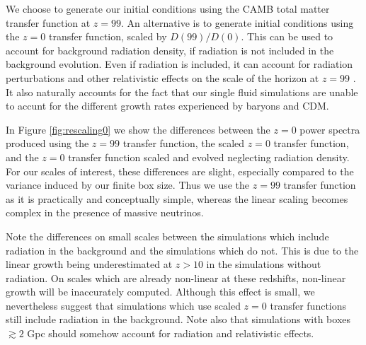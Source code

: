 \documentclass[useAMS, usenatbib]{mnras}
\begin{document}
We choose to generate our initial conditions using the CAMB total matter transfer
function at $z=99$. An alternative is to generate initial conditions
using the $z=0$ transfer function, scaled by $D(99)/D(0)$. This can
be used to account for background radiation density, if radiation is not included
in the background evolution. Even if radiation is included, it can account
for radiation perturbations and other relativistic effects on the scale
of the horizon at $z=99$ \citep{Zennaro_2017}. It also naturally accounts
for the fact that our single fluid simulations are unable to accunt for
the different growth rates experienced by baryons and CDM.

In Figure \ref{fig:rescaling0} we show the differences between the $z=0$
power spectra produced using the $z=99$ transfer function, the
scaled $z=0$ transfer function, and the $z=0$ transfer function
scaled and evolved neglecting radiation density.
For our scales of interest, these differences are slight,
especially compared to the variance induced by our finite box size.
Thus we use the $z=99$ transfer function as it is practically and conceptually simple,
whereas the linear scaling becomes complex in the presence of massive neutrinos.

Note the differences on small scales between the simulations which
include radiation in the background and the simulations which do not.
This is due to the linear growth being underestimated
at $z > 10$ in the simulations without radiation. On scales which are
already non-linear at these redshifts, non-linear growth will be inaccurately
computed. Although this effect is small, we nevertheless suggest that simulations
which use scaled $z=0$ transfer functions still include radiation in the background.
Note also that simulations with boxes $\gtrsim 2$ Gpc should somehow account
for radiation and relativistic effects.

\label{lastpage}


\end{document}
